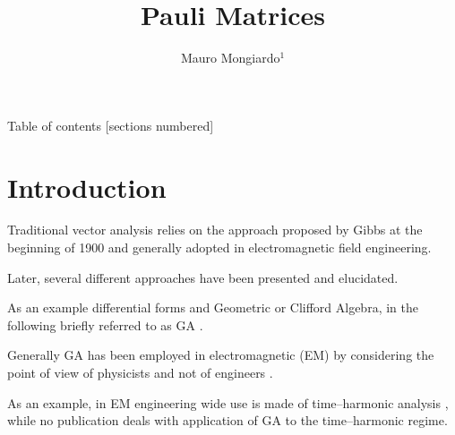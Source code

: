 \documentclass[10pt]{beamer}
\title{Pauli Matrices}
\date{}
\author{ Mauro Mongiardo$^1$}
\institute{ $^1$ Department of Engineering, University of Perugia, Perugia, Italy.
}
\begin{document}
\maketitle

\begin{frame}{Table of contents}
  [sections numbered]
  \tableofcontents[hideallsubsections]
\end{frame}

\section{Introduction}

\begin{frame}[fragile]{}

Traditional vector analysis relies on the approach proposed by Gibbs at the beginning of 1900 \cite{gibbs} and generally adopted in electromagnetic field engineering.

Later, several different approaches have been presented and elucidated.

As an example differential forms \cite{russer} and Geometric or Clifford Algebra, in the following briefly referred to as GA \cite{hestenes}\cite{seagar}. 

\alert{Generally GA has been employed in electromagnetic (EM) by considering the point of view of physicists and not of engineers \cite{arthur}\cite{abbott}.}

As an example, in EM  engineering  wide use is made of time--harmonic analysis \cite{harrington}, while no publication deals with application of GA to the time--harmonic regime.

\end{frame}
\end{document}
